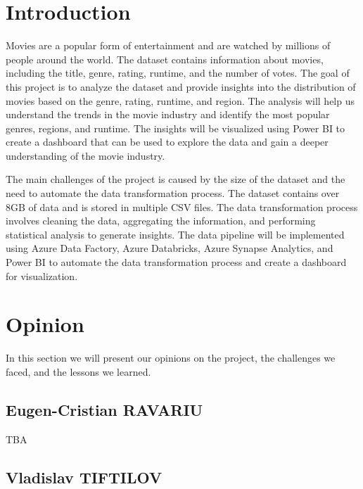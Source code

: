 \documentclass[a4paper,12pt]{article}
\begin{document}
\newpage
\tableofcontents  %
\newpage

\section{Introduction}
\label{sec:introduction}

Movies are a popular form of entertainment and are watched by millions of people around the world. 
The dataset contains information about movies, including the title, genre, rating, runtime, and the 
number of votes. The goal of this project is to analyze the dataset and provide insights into the 
distribution of movies based on the genre, rating, runtime, and region. The analysis will help us 
understand the trends in the movie industry and identify the most popular genres, regions, and runtime. 
The insights will be visualized using Power BI to create a dashboard that can be used to explore the 
data and gain a deeper understanding of the movie industry.

The main challenges of the project is caused by the size of the dataset and the need to automate 
the data transformation process. The dataset contains over 8GB of data and is stored in multiple 
CSV files. The data transformation process involves cleaning the data, aggregating the information, 
and performing statistical analysis to generate insights. The data pipeline will be implemented using 
Azure Data Factory, Azure Databricks, Azure Synapse Analytics, and Power BI to automate the data 
transformation process and create a dashboard for visualization.

\section{Opinion}
\label{sec:opinion}

In this section we will present our opinions on the project, the challenges we faced, and the lessons we learned.

\subsection{Eugen-Cristian RAVARIU}

TBA

\subsection{Vladislav TIFTILOV}
\end{document}
